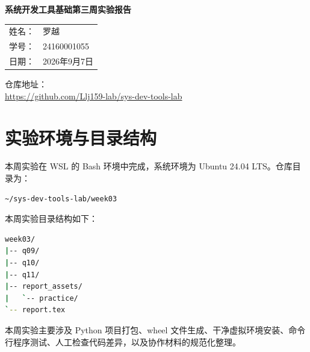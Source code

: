\documentclass[UTF8,a4paper,12pt]{ctexart}
\begin{document}
\begin{titlepage}
    \thispagestyle{empty}

    \vspace*{2.6cm}

    \begin{center}
        {\LARGE\bfseries 系统开发工具基础第三周实验报告\par}
    \end{center}

    \vspace{4.2cm}

    \begin{center}
        \begin{tabular}{rl}
            姓名： & 罗越 \\
            学号： & 24160001055 \\
            日期： & 2026年9月7日
        \end{tabular}
    \end{center}

    \vspace{1.5cm}

    \begin{center}
        仓库地址：\\
        \url{https://github.com/Llj159-lab/sys-dev-tools-lab}
    \end{center}
\end{titlepage}


\tableofcontents

\newpage

\section{实验环境与目录结构}

本周实验在 WSL 的 Bash 环境中完成，系统环境为 Ubuntu 24.04 LTS。仓库目录为：

\begin{lstlisting}[language=bash]
~/sys-dev-tools-lab/week03
\end{lstlisting}

本周实验目录结构如下：

\begin{lstlisting}[language=bash]
week03/
|-- q09/
|-- q10/
|-- q11/
|-- report_assets/
|   `-- practice/
`-- report.tex
\end{lstlisting}

本周实验主要涉及 Python 项目打包、wheel 文件生成、干净虚拟环境安装、命令行程序测试、人工检查代码差异，以及协作材料的规范化整理。
\end{document}
